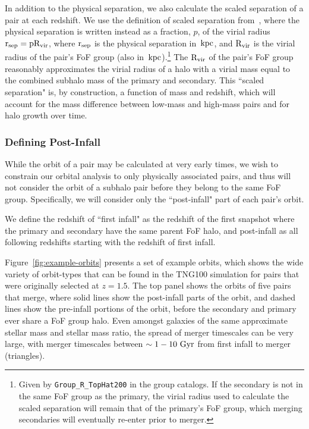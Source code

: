\documentclass[twocolumn,linenumbers]{aastex631}
\begin{document}
In addition to the physical separation, we also calculate the scaled separation of a pair at each redshift. We use the definition of scaled separation from~\cite{Chamberlain2024}, where the physical separation is written instead as a fraction, $p$, of the virial radius $\rm r_{sep}=p\rm R_{vir}$, where $\rm r_{sep}$ is the physical separation in $\mathrm{\,kpc}$, and $\rm R_{vir}$ is the virial radius of the pair's FoF group (also in $\mathrm{\,kpc}$).\footnote{Given by \texttt{Group\_R\_TopHat200} in the group catalogs. If the secondary is not in the same FoF group as the primary, the virial radius used to calculate the scaled separation will remain that of the primary's FoF group, which merging secondaries will eventually re-enter prior to merger.} 
The $\rm R_{vir}$ of the pair's FoF group reasonably approximates the virial radius of a halo with a virial mass equal to the combined subhalo mass of the primary and secondary.
This ``scaled separation" is, by construction, a function of mass and redshift, which will account for the mass difference between low-mass and high-mass pairs and for halo growth over time. 


\subsubsection{Defining Post-Infall}
While the orbit of a pair may be calculated at very early times, we wish to constrain our orbital analysis to only physically associated pairs, and thus will not consider the orbit of a subhalo pair before they belong to the same FoF group. 
Specifically, we will consider only the ``post-infall" part of each pair's orbit. 

We define the redshift of ``first infall" as the redshift of the first snapshot where the primary and secondary have the same parent FoF halo, and post-infall as all following redshifts starting with the redshift of first infall. 

Figure~\ref{fig:example-orbits} presents a set of example orbits, which shows the wide variety of orbit-types that can be found in the TNG100 simulation for pairs that were originally selected at $z=1.5$. 
The top panel shows the orbits of five pairs that merge, where solid lines show the post-infall parts of the orbit, and dashed lines show the pre-infall portions of the orbit, before the secondary and primary ever share a FoF group halo. 
Even amongst galaxies of the same approximate stellar mass and stellar mass ratio, the spread of merger timescales can be very large, with merger timescales between $\sim1-10\,\mathrm{\,Gyr}$ from first infall to merger (triangles). 
\end{document}
